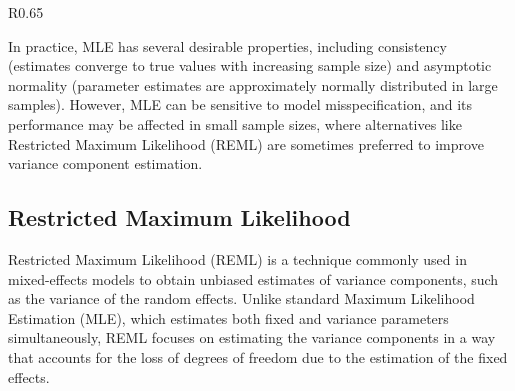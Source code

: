 \begin{wrapfigure}{R}{0.65\textwidth}
\begin{tcolorbox}[every float=\centering, drop shadow, title=Two-parameter MLE ,colback=white,colframe=WMgreen,
  colbacktitle=WMgreen,]
  \label{fig:MLEsurf}
 \end{tcolorbox}
 \end{wrapfigure}
 
 In practice, MLE has several desirable properties, including consistency (estimates converge to true values with increasing sample size) and asymptotic normality (parameter estimates are approximately normally distributed in large samples). However, MLE can be sensitive to model misspecification, and its performance may be affected in small sample sizes, where alternatives like Restricted Maximum Likelihood (REML) are sometimes preferred to improve variance component estimation.

\subsection{Restricted Maximum Likelihood}
Restricted Maximum Likelihood (REML) is a technique commonly used in mixed-effects models to obtain unbiased estimates of variance components, such as the variance of the random effects. Unlike standard Maximum Likelihood Estimation (MLE), which estimates both fixed and variance parameters simultaneously, REML focuses on estimating the variance components in a way that accounts for the loss of degrees of freedom due to the estimation of the fixed effects.

